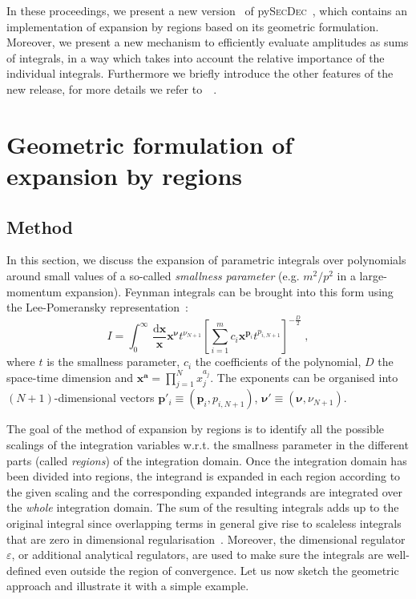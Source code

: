 \documentclass[Physsubmission, Phys]{SciPost}
\newcommand{\pysecdec}{py{\textsc{SecDec}}}
\newcommand{\eps}{\varepsilon}
\begin{document}
In these proceedings, we present a new version~\cite{Heinrich:2021dbf} of \pysecdec~\cite{Borowka:2017idc,Borowka:2018goh}, which contains an implementation of expansion by regions based on its geometric formulation.
Moreover, we present a new mechanism to efficiently evaluate amplitudes as sums of integrals, in a way which takes into account the relative importance of the individual integrals. Furthermore we briefly introduce the other features of the new release, for more details we refer to~~\cite{Heinrich:2021dbf}.

\section{Geometric formulation of expansion by regions}
\label{sec:1}

\subsection{Method}
\label{subsec:11}

In this section, we discuss the expansion of parametric integrals over polynomials around small values of a so-called {\em smallness parameter} (e.g. $m^2/p^2$ in a large-momentum expansion).
Feynman integrals can be brought into this form using the Lee-Pomeransky representation~\cite{Lee:2013hzt}:
\begin{equation}
I = \int_0^{\infty}\,\frac{\mathrm{d}\mathbf{x}}{\mathbf{x}} \mathbf{x}^{\bm{\nu}} t^{\nu_{N+1}} \left[ \sum_{i=1}^m c_i \mathbf{x}^{\mathbf{p}_i} t^{p_{i,N+1}} \right]^{-\frac{D}{2}}\;,
\label{eq:int}
\end{equation}
where $t$ is the smallness parameter, $c_{i}$ the coefficients of the polynomial, $D$ the space-time dimension and $\mathbf{x}^{\mathbf{a}} =\prod_{j=1}^N x_j^{a_j}$.
The exponents can be organised into $(N+1)$-dimensional vectors $\mathbf{p}'_i \equiv \left(\mathbf{p}_i, p_{i,N+1} \right)$, $\bm{\nu}' \equiv \left(\bm{\nu}, \nu_{N+1} \right)$.

The goal of the method of expansion by regions is to identify all the possible scalings of the integration variables w.r.t. the smallness parameter in the different parts (called \textit{regions}) of the integration domain. Once the integration domain has been divided into regions, the integrand is expanded in each region according to the given scaling and the corresponding expanded integrands are integrated over the \textit{whole} integration domain. The sum of the resulting integrals adds up to the original integral since overlapping terms in general give rise to scaleless integrals that are zero in dimensional regularisation~\cite{Jantzen:2011nz}. Moreover, the dimensional regulator $\eps$, or additional analytical regulators, are used to make sure the integrals are well-defined even outside the region of convergence.
Let us now sketch the geometric approach and illustrate it with a simple example.
\end{document}
